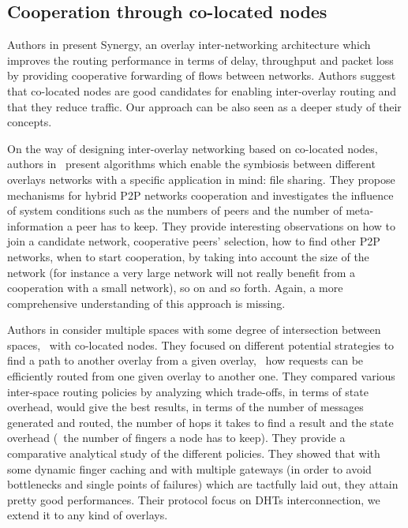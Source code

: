 \subsection{Cooperation through co-located nodes}

Authors in \cite{kwon_synergy:overlay_2005} present Synergy, an
overlay inter-networking architecture which improves the routing
performance in terms of delay, throughput and packet loss by providing
cooperative forwarding of flows between networks. Authors suggest that
co-located nodes are good candidates for enabling inter-overlay
routing and that they reduce traffic. Our approach can be also seen as
a deeper study of their concepts.

On the way of designing inter-overlay networking based on co-located
nodes, authors in~\cite{junjiro_design_2006} present algorithms which
enable the symbiosis between different overlays networks with a
specific application in mind: file sharing. They propose mechanisms
for hybrid P2P networks cooperation and investigates the influence of
system conditions such as the numbers of peers and the number of
meta-information a peer has to keep. They provide interesting
observations on how to join a candidate network, cooperative peers'
selection, how to find other P2P networks, when to start cooperation,
by taking into account the size of the network (for instance a very
large network will not really benefit from a cooperation with a small
network), so on and so forth. Again, a more comprehensive
understanding of this approach is missing.



Authors in \cite{furtado_multiple_2007} consider multiple spaces with
some degree of intersection between spaces, \ie\ with co-located
nodes. They focused on different potential strategies to find a path
to another overlay from a given overlay, \ie\ how requests can be
efficiently routed from one given overlay to another one. They
compared various inter-space routing policies by analyzing which
trade-offs, in terms of state overhead, would give the best results,
in terms of the number of messages generated and routed, the number of
hops it takes to find a result and the state overhead (\ie\ the number
of fingers a node has to keep). They provide a comparative analytical
study of the different policies. They showed that with some dynamic
finger caching and with multiple gateways (in order to avoid
bottlenecks and single points of failures) which are tactfully laid
out, they attain pretty good performances. Their protocol focus on
DHTs interconnection, we extend it to any kind of overlays.

